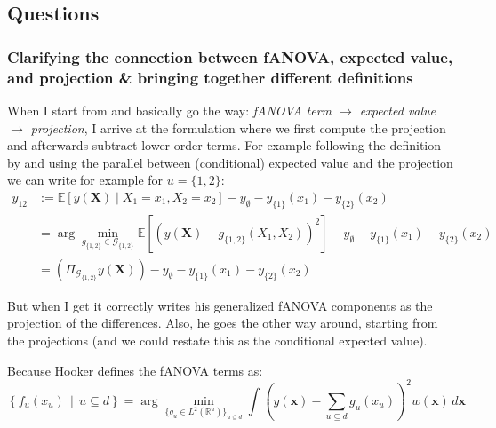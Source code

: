 
\subsection*{Questions}
\subsubsection*{Clarifying the connection between fANOVA, expected value, and projection \& bringing together different definitions}
When I start from \cite{muehlenstaedt2012} and basically go the way: \textit{fANOVA term $\rightarrow$ expected value $\rightarrow$ projection}, I arrive at the formulation where we first compute the projection and afterwards subtract lower order terms. For example following the definition by \cite{muehlenstaedt2012} and using the parallel between (conditional) expected value and the projection \citep{vanravenzwaaij2018} we can write for example for $u = \{1,2\}$:
\begin{align*}
    y_{12}
    &:= \mathbb{E}[y(\boldsymbol{X}) \mid X_1 = x_1, X_2 = x_2] - y_\emptyset - y_{\{1\}}(x_1) - y_{\{2\}}(x_2) \\
    &= \arg\min_{g_{\{1,2\}} \in \mathcal{G}_{\{1,2\}}} \mathbb{E}\left[(y(\boldsymbol{X}) - g_{\{1,2\}}(X_1, X_2))^2\right] - y_\emptyset - y_{\{1\}}(x_1) - y_{\{2\}}(x_2) \\
    &= (\Pi_{\mathcal{G}_{\{1,2\}}}y(\boldsymbol{X})) - y_\emptyset - y_{\{1\}}(x_1) - y_{\{2\}}(x_2)
\end{align*}

But when I get it correctly \cite{hooker2007} writes his generalized fANOVA components as the projection of the differences. Also, he goes the other way around, starting from the projections (and we could restate this as the conditional expected value).

Because Hooker defines the fANOVA terms as:
\begin{equation}
\left\{ f_u(x_u) \,\middle|\, u \subseteq d \right\}
= \arg\min_{\{g_u \in L^2(\mathbb{R}^u)\}_{u \subseteq d}} 
\int \left( y(\boldsymbol{x}) - \sum_{u \subseteq d} g_u(x_u) \right)^2 w(\boldsymbol{x}) \, d\boldsymbol{x}
\label{eq:fanova_decomposition_generalized}
\end{equation}

